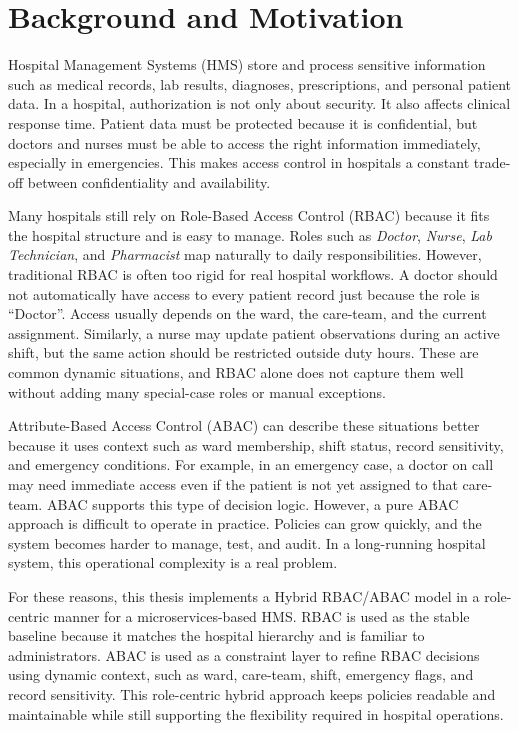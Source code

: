 \section{Background and Motivation}
Hospital Management Systems (HMS) store and process sensitive information such as medical records, lab results, diagnoses, prescriptions, and personal patient data. In a hospital, authorization is not only about security. It also affects clinical response time. Patient data must be protected because it is confidential, but doctors and nurses must be able to access the right information immediately, especially in emergencies. This makes access control in hospitals a constant trade-off between confidentiality and availability.
\vspace{0.5cm}


Many hospitals still rely on Role-Based Access Control (RBAC) because it fits the hospital structure and is easy to manage. Roles such as \textit{Doctor}, \textit{Nurse}, \textit{Lab Technician}, and \textit{Pharmacist} map naturally to daily responsibilities. However, traditional RBAC is often too rigid for real hospital workflows. A doctor should not automatically have access to every patient record just because the role is ``Doctor''. Access usually depends on the ward, the care-team, and the current assignment. Similarly, a nurse may update patient observations during an active shift, but the same action should be restricted outside duty hours. These are common dynamic situations, and RBAC alone does not capture them well without adding many special-case roles or manual exceptions.
\vspace{0.5cm}


Attribute-Based Access Control (ABAC) can describe these situations better because it uses context such as ward membership, shift status, record sensitivity, and emergency conditions. For example, in an emergency case, a doctor on call may need immediate access even if the patient is not yet assigned to that care-team. ABAC supports this type of decision logic. However, a pure ABAC approach is difficult to operate in practice. Policies can grow quickly, and the system becomes harder to manage, test, and audit. In a long-running hospital system, this operational complexity is a real problem.
\vspace{0.5cm}


For these reasons, this thesis implements a Hybrid RBAC/ABAC model in a role-centric manner for a microservices-based HMS. RBAC is used as the stable baseline because it matches the hospital hierarchy and is familiar to administrators. ABAC is used as a constraint layer to refine RBAC decisions using dynamic context, such as ward, care-team, shift, emergency flags, and record sensitivity. This role-centric hybrid approach keeps policies readable and maintainable while still supporting the flexibility required in hospital operations.
\vspace{0.5cm}


